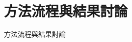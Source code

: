 \documentclass[12pt,aspectratio=43]{beamer}
\begin{document}


\section{方法流程與結果討論}

\begin{frame}
  \centering
  \huge{方法流程與結果討論}
\end{frame}
\end{document}

